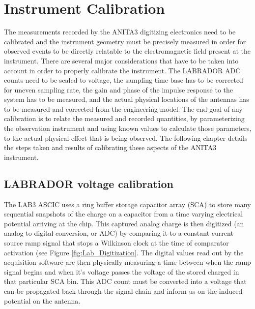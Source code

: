 	
\chapter{Instrument Calibration}

	The measurements recorded by the ANITA3 digitizing electronics need to be calibrated and the instrument geometry must be precisely measured in order for observed events to be directly relatable to the electromagnetic field present at the instrument.  There are several major considerations that have to be taken into account in order to properly calibrate the instrument.  The LABRADOR ADC counts need to be scaled to voltage, the sampling time base has to be corrected for uneven sampling rate, the gain and phase of the impulse response to the system has to be measured, and the actual physical locations of the antennas has to be measured and corrected from the engineering model.  The end goal of any calibration is to relate the measured and recorded quantities, by parameterizing the observation instrument and using known values to calculate those parameters, to the actual physical effect that is being observed.  The following chapter details the steps taken and results of calibrating these aspects of the ANITA3 instrument.
	

	
\section{LABRADOR voltage calibration}
		The LAB3 ASCIC uses a ring buffer storage capacitor array (SCA) to store many sequential snapshots of the charge on a capacitor from a time varying electrical potential arriving at the chip.  This captured analog charge is then digitized (an analog to digital conversion, or ADC) by comparing it to a constant current source ramp signal that stops a Wilkinson clock at the time of comparator activation (see Figure \ref{fig:Lab_Digitization}.  The digital values read out by the acquisition software are then physically measuring a time between when the ramp signal begins and when it's voltage passes the voltage of the stored charged in that particular SCA bin.  This ADC count must be converted into a voltage that can be propagated back through the signal chain and inform us on the induced potential on the antenna.

